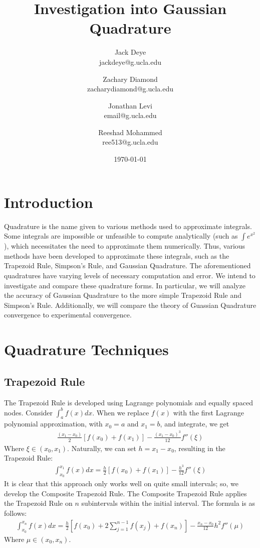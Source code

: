 \documentclass[12pt]{article}
\title{Investigation into Gaussian Quadrature}
\author{
    Jack Deye\\
    jackdeye@g.ucla.edu
    \and
    Zachary Diamond\\
    zacharydiamond@g.ucla.edu
    \and
    Jonathan Levi\\
    email@g.ucla.edu
    \and
    Reeshad Mohammed\\
    ree513@g.ucla.edu
}
\date{\today}
\begin{document}
\maketitle

\tableofcontents

\newpage

\section{Introduction}

Quadrature is the name given to various methods used to approximate integrals. Some integrals are
impossible or unfeasible to compute analytically (such as $\int e^{x^2}$), which necessitates the need to approximate them numerically.
Thus, various methods have been developed to approximate these integrals, such as the Trapezoid Rule, Simpson's Rule, and Gaussian Quadrature.
The aforementioned quadratures have varying levels of necessary computation and error. We intend to investigate and compare these quadrature forms.
In particular, we will analyze the accuracy of Gaussian Quadrature to the more simple Trapezoid Rule and Simpson's Rule.
Additionally, we will compare the theory of Guassian Quadrature convergence to experimental convergence.

\section{Quadrature Techniques}
\subsection{Trapezoid Rule}
The Trapezoid Rule is developed using Lagrange polynomials and equally spaced nodes. Consider $\int_a^b f(x)dx$. When we replace $f(x)$
with the first Lagrange polynomial approximation, with $x_0 = a$ and $x_1 = b$, and integrate, we get
\begin{align*}
	\frac{(x_1 - x_0)}{2}[f(x_0) + f(x_1)] - \frac{(x_1 - x_0)^3}{12}f''(\xi)
\end{align*}
Where $\xi \in (x_0, x_1)$. Naturally, we can set $h = x_1 - x_0$, resulting in the Trapezoid Rule:
\begin{align*}
	\int_{x_0}^{x_1}f(x)dx = \frac{h}{2}[f(x_0) + f(x_1)] - \frac{h^3}{12}f''(\xi)
\end{align*}
It is clear that this approach only works well on quite small intervals; so, we develop the Composite Trapezoid Rule. The Composite Trapezoid Rule
applies the Trapezoid Rule on $n$ subintervals within the initial interval. The formula is as follows:
\begin{align*}
	\int_{x_0}^{x_n}f(x)dx = \frac{h}{2}[f(x_0) + 2\sum_{j=1}^{n-1}f(x_j) + f(x_n)] - \frac{x_n - x_0}{12}h^2f''(\mu)
\end{align*}
Where $\mu \in (x_0, x_n)$.
\end{document}
